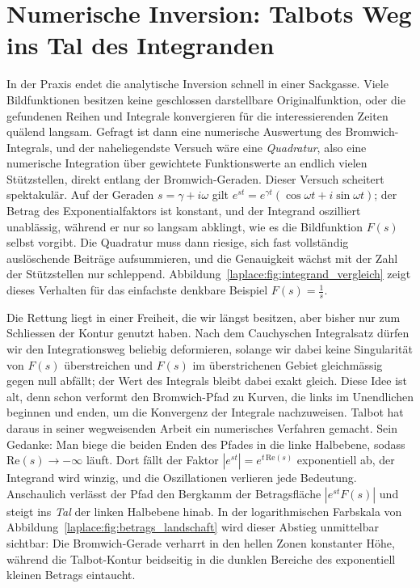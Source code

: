 %
%
\section{Numerische Inversion: Talbots Weg ins Tal des Integranden}
\label{laplace:subsection:talbot}
%

In der Praxis endet die analytische Inversion schnell in einer Sackgasse.
Viele Bildfunktionen besitzen keine geschlossen darstellbare
Originalfunktion, oder die gefundenen Reihen und Integrale konvergieren
für die interessierenden Zeiten quälend langsam.
Gefragt ist dann eine numerische Auswertung des Bromwich-Integrals, und
der naheliegendste Versuch wäre eine \emph{Quadratur}, also eine
%
numerische Integration über gewichtete Funktionswerte an endlich vielen
Stützstellen, direkt entlang der Bromwich-Geraden.
Dieser Versuch scheitert spektakulär.
Auf der Geraden $s = \gamma + i\omega$ gilt
$e^{st} = e^{\gamma t} \left( \cos \omega t + i \sin \omega t \right)$;
der Betrag des Exponentialfaktors ist konstant, und der Integrand
oszilliert unablässig, während er nur so langsam abklingt, wie es die
Bildfunktion $F(s)$ selbst vorgibt.
Die Quadratur muss dann riesige, sich fast vollständig auslöschende
Beiträge aufsummieren, und die Genauigkeit wächst mit der Zahl der
Stützstellen nur schleppend.
Abbildung~\ref{laplace:fig:integrand_vergleich} zeigt dieses Verhalten für
das einfachste denkbare Beispiel $F(s) = \frac{1}{s}$.



Die Rettung liegt in einer Freiheit, die wir längst besitzen, aber bisher
nur zum Schliessen der Kontur genutzt haben.
Nach dem Cauchyschen Integralsatz dürfen wir den Integrationsweg beliebig
deformieren, solange wir dabei keine Singularität von $F(s)$ überstreichen
und $F(s)$ im überstrichenen Gebiet gleichmässig gegen null abfällt; der
Wert des Integrals bleibt dabei exakt gleich.
Diese Idee ist alt, denn schon \cite{laplace:carslaw1959} verformt den
Bromwich-Pfad zu Kurven, die links im Unendlichen beginnen und enden, um
die Konvergenz der Integrale nachzuweisen.
Talbot hat daraus in seiner wegweisenden Arbeit
%
\cite{laplace:talbot1979} ein numerisches Verfahren gemacht.
Sein Gedanke:
Man biege die beiden Enden des Pfades in die linke Halbebene, sodass
$\text{Re}(s) \to -\infty$ läuft.
Dort fällt der Faktor $|e^{st}| = e^{t\,\text{Re}(s)}$ exponentiell ab, der
Integrand wird winzig, und die Oszillationen verlieren jede Bedeutung.
Anschaulich verlässt der Pfad den Bergkamm der Betragsfläche
$|e^{st}F(s)|$ und steigt ins \emph{Tal} der linken Halbebene hinab.
%
In der logarithmischen Farbskala von
Abbildung~\ref{laplace:fig:betrags_landschaft} wird dieser Abstieg
unmittelbar sichtbar:
Die Bromwich-Gerade verharrt in den hellen Zonen konstanter Höhe,
während die Talbot-Kontur beidseitig in die dunklen Bereiche des
%
exponentiell kleinen Betrags eintaucht.

